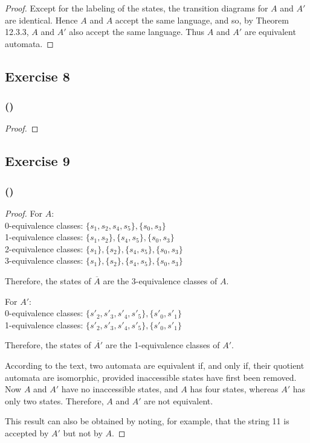 \documentclass[14pt]{extarticle}
\begin{document}
\begin{proof}
Except for the labeling of the states, the transition diagrams for \(A\) and \(A'\) are identical. Hence \(A\) and \(A\) 
accept the same language, and so, by Theorem 12.3.3, \(A\) and \(A'\) also accept the same language. Thus \(A\) and \(A'\) 
are equivalent automata.
\end{proof}

\subsection{Exercise 8}

\subsubsection{()}

\begin{proof}

\end{proof}

\subsection{Exercise 9}

\subsubsection{()}

\begin{proof}
For \(A\): \\
0-equivalence classes: \(\{s_1, s_2, s_4, s_5\}, \{s_0, s_3\}\) \\
1-equivalence classes: \(\{s_1, s_2\}, \{s_4, s_5\}, \{s_0, s_3\}\) \\
2-equivalence classes: \(\{s_1\}, \{s_2\}, \{s_4, s_5\}, \{s_0, s_3\}\) \\
3-equivalence classes: \(\{s_1\}, \{s_2\}, \{s_4, s_5\}, \{s_0, s_3\}\)

Therefore, the states of \(\overline{A}\) are the 3-equivalence classes of \(A\).

For \(A'\): \\
0-equivalence classes: \(\{s'_2, s'_3, s'_4, s'_5\}, \{s'_0, s'_1\}\) \\
1-equivalence classes: \(\{s'_2, s'_3, s'_4, s'_5\}, \{s'_0, s'_1\}\)

Therefore, the states of \(\overline{A'}\) are the 1-equivalence classes of \(A'\).

According to the text, two automata are equivalent if, and only if, their quotient automata are isomorphic, provided 
inaccessible states have first been removed. Now \(A\) and \(A'\) have no inaccessible states, and \(A\) has four states, 
whereas \(A'\) has only two states. Therefore, \(A\) and \(A'\) are not equivalent.

This result can also be obtained by noting, for example, that the string 11 is accepted by \(A'\) but not by \(A\).
\end{proof}
\end{document}
